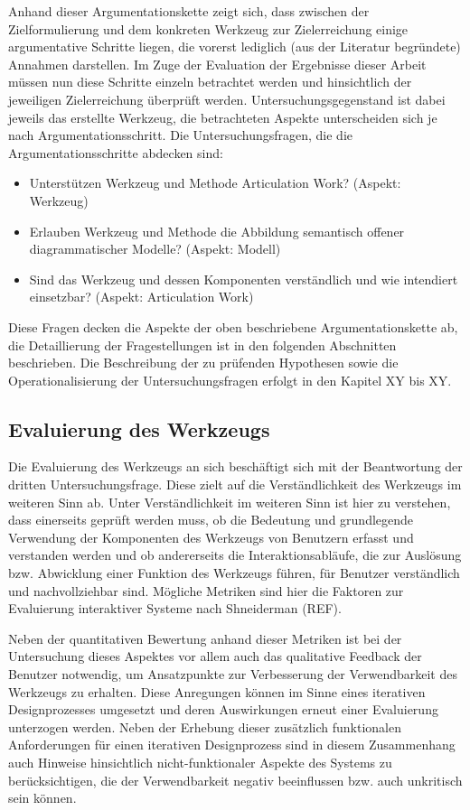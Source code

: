 Anhand dieser Argumentationskette zeigt sich, dass zwischen der Zielformulierung und dem konkreten Werkzeug zur Zielerreichung einige argumentative Schritte liegen, die vorerst lediglich (aus der Literatur begründete) Annahmen darstellen. Im Zuge der Evaluation der Ergebnisse dieser Arbeit müssen nun diese Schritte einzeln betrachtet werden und hinsichtlich der jeweiligen Zielerreichung überprüft werden. Untersuchungsgegenstand ist dabei jeweils das erstellte Werkzeug, die betrachteten Aspekte unterscheiden sich je nach Argumentationsschritt. Die Untersuchungsfragen, die die Argumentationsschritte abdecken sind:
\begin{itemize}
 \item Unterstützen Werkzeug und Methode Articulation Work? (Aspekt: Werkzeug)
 \item Erlauben Werkzeug und Methode die Abbildung semantisch offener diagrammatischer Modelle? (Aspekt: Modell)
 \item Sind das Werkzeug und dessen Komponenten verständlich und wie intendiert einsetzbar? (Aspekt: Articulation Work)
\end{itemize}

Diese Fragen decken die Aspekte der oben beschriebene Argumentationskette ab, die Detaillierung der Fragestellungen ist in den folgenden Abschnitten beschrieben. Die Beschreibung der zu prüfenden Hypothesen sowie die Operationalisierung der Untersuchungsfragen erfolgt in den Kapitel XY bis XY.

\subsection{Evaluierung des Werkzeugs}
\label{sub:eval_werkzeug}

Die Evaluierung des Werkzeugs an sich beschäftigt sich mit der Beantwortung der dritten Untersuchungsfrage. Diese zielt auf die Verständlichkeit des Werkzeugs im weiteren Sinn ab. Unter Verständlichkeit im weiteren Sinn ist hier zu verstehen, dass einerseits geprüft werden muss, ob die Bedeutung und grundlegende Verwendung der Komponenten des Werkzeugs von Benutzern erfasst und verstanden werden und ob andererseits die Interaktionsabläufe, die zur Auslösung bzw. Abwicklung einer Funktion des Werkzeugs führen, für Benutzer verständlich und nachvollziehbar sind. Mögliche Metriken sind hier die Faktoren zur Evaluierung interaktiver Systeme nach Shneiderman (REF).

Neben der quantitativen Bewertung anhand dieser Metriken ist bei der Untersuchung dieses Aspektes vor allem auch das qualitative Feedback der Benutzer notwendig, um Ansatzpunkte zur Verbesserung der Verwendbarkeit des Werkzeugs zu erhalten. Diese Anregungen können im Sinne eines iterativen Designprozesses umgesetzt und deren Auswirkungen erneut einer Evaluierung unterzogen werden. Neben der Erhebung dieser zusätzlich funktionalen Anforderungen für einen iterativen Designprozess sind in diesem Zusammenhang auch Hinweise hinsichtlich nicht-funktionaler Aspekte des Systems zu berücksichtigen, die der Verwendbarkeit negativ beeinflussen bzw. auch unkritisch sein können.

